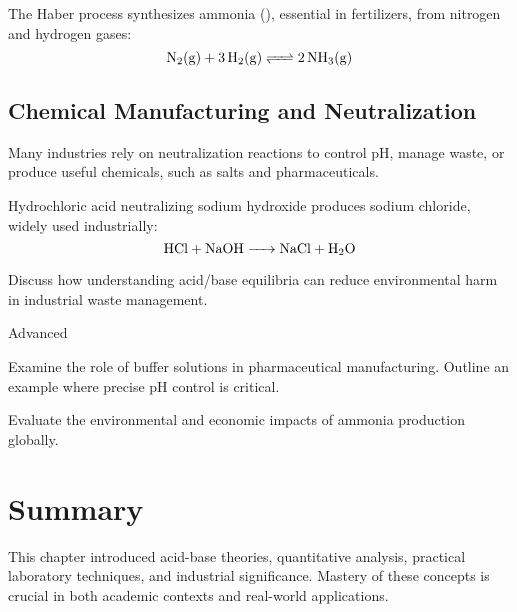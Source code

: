 The Haber process synthesizes ammonia (), essential in fertilizers, from nitrogen and hydrogen gases:
\[
\ce{N2(g) + 3H2(g) <=> 2NH3(g)}
\]


\subsection{Chemical Manufacturing and Neutralization}
\FloatBarrier
\FloatBarrier
\FloatBarrier

Many industries rely on neutralization reactions to control pH, manage waste, or produce useful chemicals, such as salts and pharmaceuticals.

\begin{example}
Hydrochloric acid neutralizing sodium hydroxide produces sodium chloride, widely used industrially:
\[
\ce{HCl + NaOH -> NaCl + H2O}
\]
\end{example}

\begin{stopandthink}
Discuss how understanding acid/base equilibria can reduce environmental harm in industrial waste management.
\end{stopandthink}

\begin{tieredquestions}{Advanced}
\item Examine the role of buffer solutions in pharmaceutical manufacturing. Outline an example where precise pH control is critical.
\item Evaluate the environmental and economic impacts of ammonia production globally.
\end{tieredquestions}

\FloatBarrier

\section*{Summary}
This chapter introduced acid-base theories, quantitative analysis, practical laboratory techniques, and industrial significance. Mastery of these concepts is crucial in both academic contexts and real-world applications.